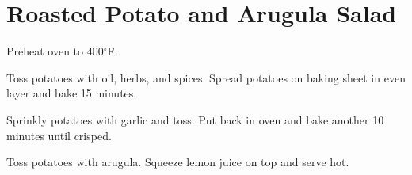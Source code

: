 \section{Roasted Potato and Arugula Salad}
\begin{recipe}



	Preheat oven to 400$^{\circ}$F.

	Toss potatoes with oil, herbs, and spices. Spread potatoes on baking sheet in even layer and bake 15 minutes.

	Sprinkly potatoes with garlic and toss. Put back in oven and bake another 10 minutes until crisped.

	Toss potatoes with arugula. Squeeze lemon juice on top and serve hot.

\end{recipe}
